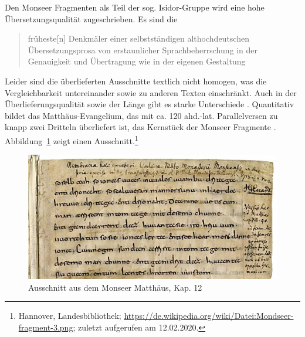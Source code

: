 Den Monseer Fragmenten als Teil der sog. Isidor-Gruppe wird eine hohe Übersetzungsqualität zugeschrieben. Es sind die \blockcquote[129]{Sonderegger2003}{früheste[n] Denkmäler einer selbstständigen althochdeutschen Übersetzungsprosa von erstaunlicher Sprachbeherrschung in der Genauigkeit und Übertragung wie in der eigenen Gestaltung}. 
Leider sind die überlieferten Ausschnitte textlich nicht homogen, was die Vergleichbarkeit untereinander sowie zu anderen Texten einschränkt. Auch in der Überlieferungsqualität sowie der Länge gibt es starke Unterschiede \parencite[s. ausführlich][]{Krotz2002,Krotz2003}. Quantitativ bildet das Matthäus-Evangelium, das mit ca. 120 ahd.-lat. Parallelversen zu knapp zwei Dritteln überliefert ist, das Kernstück der Monseer Fragmente 
\parencites()()[82]{Matzel1970}[26-27]{Schlachter2012}.
Abbildung~\ref{abb:MF-handschrift} zeigt einen Ausschnitt.\footnote{Hannover, Landesbibliothek; \url{https://de.wikipedia.org/wiki/Datei:Mondseer-fragment-3.png}; zuletzt aufgerufen am 12.02.2020.} 

\begin{figure}[h]
\begin{center}
  \includegraphics[width=10 cm]{images/MF-handschrift-ausschnitt.jpg}
\caption {Ausschnitt aus dem Monseer Matthäus, Kap. 12}
\label{abb:MF-handschrift}
\end{center}
\end{figure} 




